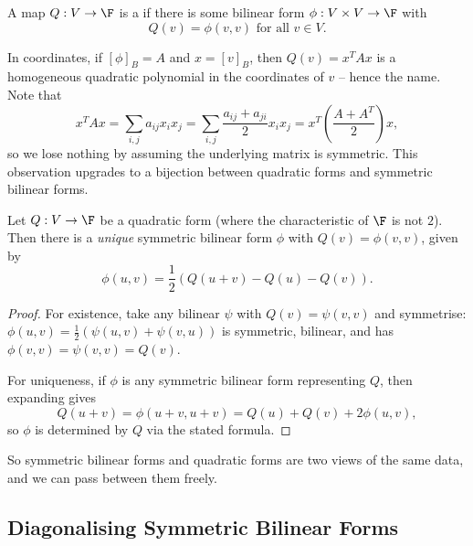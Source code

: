 \begin{definition}
    A map $Q: V \rightarrow \F$ is a  if there is some bilinear form $\phi: V \times V \rightarrow \F$ with
    $$
    Q(v) = \phi(v, v) \text{ for all } v \in V.
    $$
\end{definition}

In coordinates, if $[\phi]_B = A$ and $x = [v]_B$, then $Q(v) = x^T A x$ is a homogeneous quadratic polynomial in the coordinates of $v$ -- hence the name. Note that
$$
x^T A x = \sum_{i,j} a_{ij}x_i x_j = \sum_{i, j} \frac{a_{ij} + a_{ji}}{2} x_i x_j = x^T \left(\frac{A + A^T}{2}\right) x,
$$
so we lose nothing by assuming the underlying matrix is symmetric. This observation upgrades to a bijection between quadratic forms and symmetric bilinear forms.

\begin{proposition}
    Let $Q: V \rightarrow \F$ be a quadratic form (where the characteristic of $\F$ is not $2$). Then there is a \emph{unique} symmetric bilinear form $\phi$ with $Q(v) = \phi(v, v)$, given by
    $$
    \phi(u, v) = \frac{1}{2}\left(Q(u + v) - Q(u) - Q(v)\right).
    $$
\end{proposition}
\begin{proof}
    For existence, take any bilinear $\psi$ with $Q(v) = \psi(v,v)$ and symmetrise: $\phi(u, v) = \frac{1}{2}(\psi(u,v) + \psi(v, u))$ is symmetric, bilinear, and has $\phi(v,v) = \psi(v,v) = Q(v)$.

    For uniqueness, if $\phi$ is any symmetric bilinear form representing $Q$, then expanding gives
    $$
    Q(u + v) = \phi(u + v, u + v) = Q(u) + Q(v) + 2\phi(u, v),
    $$
    so $\phi$ is determined by $Q$ via the stated formula.
\end{proof}

So symmetric bilinear forms and quadratic forms are two views of the same data, and we can pass between them freely.

\subsection{Diagonalising Symmetric Bilinear Forms}

